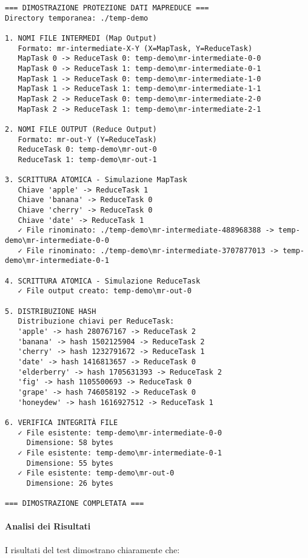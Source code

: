 \documentclass[12pt,a4paper]{article}
\begin{document}
\begin{lstlisting}[caption=Risultati del test di protezione dati]
=== DIMOSTRAZIONE PROTEZIONE DATI MAPREDUCE ===
Directory temporanea: ./temp-demo

1. NOMI FILE INTERMEDI (Map Output)
   Formato: mr-intermediate-X-Y (X=MapTask, Y=ReduceTask)
   MapTask 0 -> ReduceTask 0: temp-demo\mr-intermediate-0-0
   MapTask 0 -> ReduceTask 1: temp-demo\mr-intermediate-0-1
   MapTask 1 -> ReduceTask 0: temp-demo\mr-intermediate-1-0
   MapTask 1 -> ReduceTask 1: temp-demo\mr-intermediate-1-1
   MapTask 2 -> ReduceTask 0: temp-demo\mr-intermediate-2-0
   MapTask 2 -> ReduceTask 1: temp-demo\mr-intermediate-2-1

2. NOMI FILE OUTPUT (Reduce Output)
   Formato: mr-out-Y (Y=ReduceTask)
   ReduceTask 0: temp-demo\mr-out-0
   ReduceTask 1: temp-demo\mr-out-1

3. SCRITTURA ATOMICA - Simulazione MapTask
   Chiave 'apple' -> ReduceTask 1
   Chiave 'banana' -> ReduceTask 0
   Chiave 'cherry' -> ReduceTask 0
   Chiave 'date' -> ReduceTask 1
   ✓ File rinominato: ./temp-demo\mr-intermediate-488968388 -> temp-demo\mr-intermediate-0-0
   ✓ File rinominato: ./temp-demo\mr-intermediate-3707877013 -> temp-demo\mr-intermediate-0-1

4. SCRITTURA ATOMICA - Simulazione ReduceTask
   ✓ File output creato: temp-demo\mr-out-0

5. DISTRIBUZIONE HASH
   Distribuzione chiavi per ReduceTask:
   'apple' -> hash 280767167 -> ReduceTask 2
   'banana' -> hash 1502125904 -> ReduceTask 2
   'cherry' -> hash 1232791672 -> ReduceTask 1
   'date' -> hash 1416813657 -> ReduceTask 0
   'elderberry' -> hash 1705631393 -> ReduceTask 2
   'fig' -> hash 1105500693 -> ReduceTask 0
   'grape' -> hash 746058192 -> ReduceTask 0
   'honeydew' -> hash 1616927512 -> ReduceTask 1

6. VERIFICA INTEGRITÀ FILE
   ✓ File esistente: temp-demo\mr-intermediate-0-0
     Dimensione: 58 bytes
   ✓ File esistente: temp-demo\mr-intermediate-0-1
     Dimensione: 55 bytes
   ✓ File esistente: temp-demo\mr-out-0
     Dimensione: 26 bytes

=== DIMOSTRAZIONE COMPLETATA ===
\end{lstlisting}

\paragraph{Analisi dei Risultati}

I risultati del test dimostrano chiaramente che:
\end{document}
